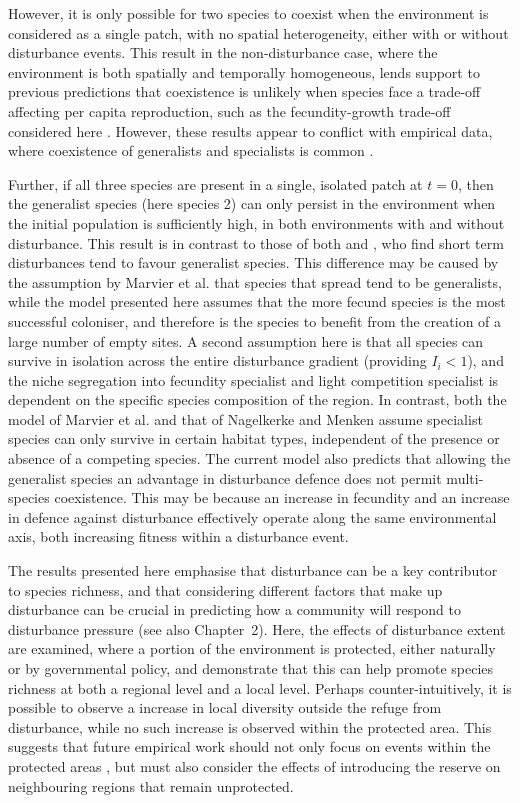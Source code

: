 However, it is only possible for two species to coexist when the environment is considered as a single patch, with no spatial heterogeneity, either with or without disturbance events. This result in the non-disturbance case, where the environment is both spatially and temporally homogeneous, lends support to previous predictions that coexistence is unlikely when species face a trade-off affecting per capita reproduction, such as the fecundity-growth trade-off considered here \cite{egas2004evolution}.
 However, these results appear to conflict with empirical data, where coexistence of generalists and specialists is common \citep[e.g.][]{morris1996coexistence,bonesi2004differential}. 
 
 Further, if all three species are present in a single, isolated patch at $t=0$, then the generalist species (here species 2) can only persist in the environment when the initial population is sufficiently high, in both environments with and without disturbance. This result is in contrast to those of both \cite{marvier2004habitat} and \cite{nagelkerke2013coexistence}, who find short term disturbances tend to favour generalist species. This difference may be caused by the assumption by Marvier et al. that species that spread tend to be generalists, while the model presented here assumes that the more fecund species is the most successful coloniser, and therefore is the species to benefit from the creation of a large number of empty sites. A second assumption here is that all species can survive in isolation across the entire disturbance gradient (providing $I_i<1$), and the niche segregation into fecundity specialist and light competition specialist is dependent on the specific species composition of the region. In contrast, both the model of Marvier et al. and that of Nagelkerke and Menken assume specialist species can only survive in certain habitat types, independent of the presence or absence of a competing species. The current model also predicts that allowing the generalist species an advantage in disturbance defence does not permit multi-species coexistence. This may be because an increase in fecundity and an increase in defence against disturbance effectively operate along the same environmental axis, both increasing fitness within a disturbance event.
 
 The results presented here emphasise that disturbance can be a key contributor to species richness, and that considering different factors that make up disturbance can be crucial in predicting how a community will respond to disturbance pressure (see also Chapter~2). Here, the effects of disturbance extent are examined, where a portion of the environment is protected, either naturally or by governmental policy, and demonstrate that this can help promote species richness at both a regional level and a local level. Perhaps counter-intuitively, it is possible to observe a increase in local diversity outside the refuge from disturbance, while no such increase is observed within the protected area. This suggests that  future empirical work should not only focus on events within the protected areas \citep[e.g.][]{pyvsek2002plant,kitchner1982predictors}, but must also consider the effects of introducing the reserve on neighbouring regions that remain unprotected.
 
